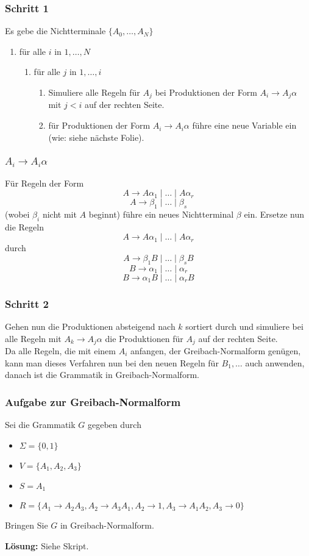 \begin{frame}
\frametitle{Schritt 1}
Es gebe die Nichtterminale $\{A_0, \ldots, A_N\}$
\begin{enumerate}
\item für alle $i$ in $1, \ldots, N$
\begin{enumerate}
\item für alle $j$ in $1, \ldots, i$
\begin{enumerate}
\item Simuliere alle Regeln für $A_j$ bei Produktionen der Form $A_i \rightarrow A_j\alpha$ mit $j < i$ auf der rechten Seite.
\item für Produktionen der Form $A_i \rightarrow A_i\alpha$ führe eine neue Variable ein (wie: siehe nächste Folie).
\end{enumerate}
\end{enumerate}
\end{enumerate}
\end{frame}

\begin{frame}
\frametitle{$A_i \rightarrow A_i\alpha$}
Für Regeln der Form 
$$A \rightarrow A\alpha_1 \mid \ldots \mid A\alpha_r$$
$$A \rightarrow \beta_1 \mid \ldots \mid \beta_s$$
(wobei $\beta_i$ nicht mit $A$ beginnt) führe ein neues Nichtterminal $\beta$ ein. Ersetze nun die Regeln
$$A \rightarrow A\alpha_1 \mid \ldots \mid A\alpha_r$$
durch
$$A \rightarrow \beta_1B \mid \ldots \mid \beta_sB$$
$$B \rightarrow \alpha_1 \mid \ldots \mid \alpha_r$$
$$B \rightarrow \alpha_1B \mid \ldots \mid \alpha_rB$$
\end{frame}

\begin{frame}
 \frametitle{Schritt 2}
Gehen nun die Produktionen absteigend nach $k$ sortiert durch und simuliere bei alle Regeln mit $A_k \rightarrow A_j\alpha$ die Produktionen für $A_j$ auf der rechten Seite.\\
Da alle Regeln, die mit einem $A_i$ anfangen, der Greibach-Normalform genügen, kann man dieses Verfahren nun bei den neuen Regeln für $B_1,\ldots$ auch anwenden, danach ist die Grammatik in Greibach-Normalform.
\end{frame}

\begin{frame}
\frametitle{Aufgabe zur Greibach-Normalform}
Sei die Grammatik $G$ gegeben durch
\begin{itemize}
 \item $\Sigma = \{0, 1\}$
 \item $V = \{A_1, A_2, A_3\}$
 \item $S = A_1$
 \item $R = \{A_1 \rightarrow A_2A_3, A_2 \rightarrow A_3A_1, A_2 \rightarrow 1, A_3 \rightarrow A_1A_2, A_3 \rightarrow 0\}$
\end{itemize}

Bringen Sie $G$ in Greibach-Normalform.

\textbf{Lösung:} Siehe Skript.
\end{frame}

